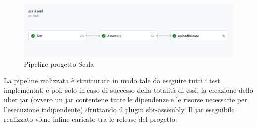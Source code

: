     \begin{figure}[H]
        \caption{Pipeline progetto Scala}
        \label{fig:scala-ci-github}
        \centering
        \includegraphics[width=1\textwidth]{Images/scalaCI-pipeline.png}
    \end{figure}

    La pipeline realizzata è strutturata in modo tale da eseguire tutti i test implementati e poi, solo in caso di successo della totalità di essi, la creazione dello uber jar (ovvero un jar contentene tutte le dipendenze e le risorse necessarie per l'esecuzione indipendente) sfruttando il plugin sbt-assembly. Il jar eseguibile realizzato viene infine caricato tra le release del progetto.






